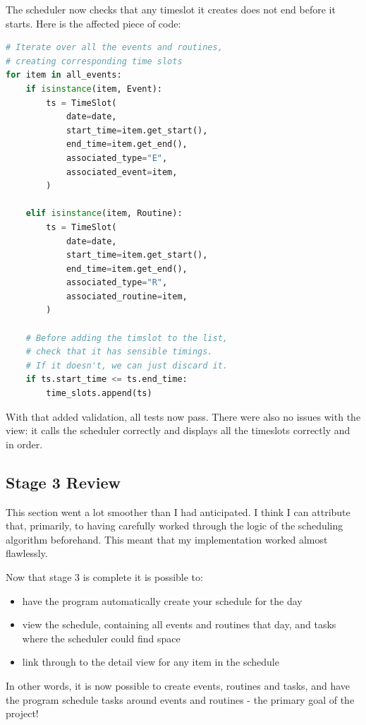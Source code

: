 \documentclass{article}
\begin{document}
The scheduler now checks that any timeslot it creates does not end before it starts.
Here is the affected piece of code:
\begin{lstlisting}[language=Python]
# Iterate over all the events and routines,
# creating corresponding time slots
for item in all_events:
    if isinstance(item, Event):
        ts = TimeSlot(
            date=date,
            start_time=item.get_start(),
            end_time=item.get_end(),
            associated_type="E",
            associated_event=item,
        )

    elif isinstance(item, Routine):
        ts = TimeSlot(
            date=date,
            start_time=item.get_start(),
            end_time=item.get_end(),
            associated_type="R",
            associated_routine=item,
        )

    # Before adding the timslot to the list,
    # check that it has sensible timings.
    # If it doesn't, we can just discard it.
    if ts.start_time <= ts.end_time:
        time_slots.append(ts)
\end{lstlisting}

With that added validation,
all tests now pass.
There were also no issues with the view:
it calls the scheduler correctly and displays all the timeslots correctly and in order.

\subsection{Stage 3 Review}
This section went a lot smoother than I had anticipated.
I think I can attribute that, primarily,
to having carefully worked through the logic of the scheduling algorithm beforehand.
This meant that my implementation worked almost flawlessly.

Now that stage 3 is complete it is possible to:
\begin{itemize}
	\item have the program automatically create your schedule for the day
	\item view the schedule,
	      containing all events and routines that day,
	      and tasks where the scheduler could find space
	\item link through to the detail view for any item in the schedule
\end{itemize}

In other words,
it is now possible to create events, routines and tasks,
and have the program schedule tasks around events and routines -
the primary goal of the project!
\end{document}
